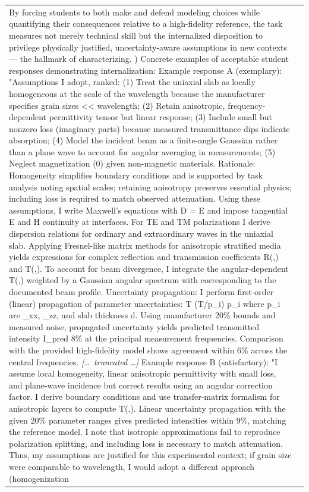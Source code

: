 \begin{longtable}{@{}l p{12.5cm}@{}}
By forcing students to both make and defend modeling choices while quantifying their consequences relative to a high-fidelity reference, the task measures not merely technical skill but the internalized disposition to privilege physically justified, uncertainty-aware assumptions in new contexts --- the hallmark of characterizing. \newline 4) Concrete examples of acceptable student responses demonstrating internalization: Example response A (exemplary): "Assumptions I adopt, ranked: (1) Treat the uniaxial slab as locally homogeneous at the scale of the wavelength because the manufacturer specifies grain sizes \textless{}\textless{} wavelength; (2) Retain anisotropic, frequency-dependent permittivity tensor but linear response; (3) Include small but nonzero loss (imaginary parts) because measured transmittance dips indicate absorption; (4) Model the incident beam as a finite-angle Gaussian rather than a plane wave to account for angular averaging in measurements; (5) Neglect magnetization (0) given non-magnetic materials. Rationale: Homogeneity simplifies boundary conditions and is supported by task analysis noting spatial scales; retaining anisotropy preserves essential physics; including loss is required to match observed attenuation. \newline Using these assumptions, I write Maxwell's equations with D = E and impose tangential E and H continuity at interfaces. For TE and TM polarizations I derive dispersion relations for ordinary and extraordinary waves in the uniaxial slab. Applying Fresnel-like matrix methods for anisotropic stratified media yields expressions for complex reflection and transmission coefficients R(,) and T(,). To account for beam divergence, I integrate the angular-dependent T(,) weighted by a Gaussian angular spectrum with corresponding to the documented beam profile. \newline Uncertainty propagation: I perform first-order (linear) propagation of parameter uncertainties: T (T/p\_i) p\_i where p\_i are \_xx, \_zz, and slab thickness d. Using manufacturer 20\% bounds and measured noise, propagated uncertainty yields predicted transmitted intensity I\_pred 8\% at the principal measurement frequencies. Comparison with the provided high-fidelity model shows agreement within 6\% across the central frequencies. \newline \textit{[\ldots\ truncated \ldots]} \newline Example response B (satisfactory): "I assume local homogeneity, linear anisotropic permittivity with small loss, and plane-wave incidence but correct results using an angular correction factor. I derive boundary conditions and use transfer-matrix formalism for anisotropic layers to compute T(,). Linear uncertainty propagation with the given 20\% parameter ranges gives predicted intensities within 9\%, matching the reference model. I note that isotropic approximations fail to reproduce polarization splitting, and including loss is necessary to match attenuation. Thus, my assumptions are justified for this experimental context; if grain size were comparable to wavelength, I would adopt a different approach (homogenization 
\end{longtable}
